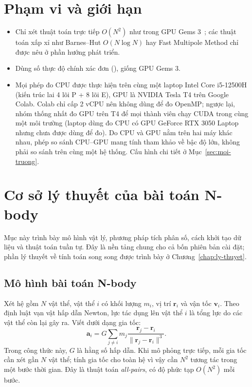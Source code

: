 \section{Phạm vi và giới hạn}

\begin{itemize}
\item Chỉ xét thuật toán trực tiếp $O(N^2)$ như trong GPU Gems 3~\cite{gpugems3}; các thuật toán xấp xỉ như Barnes--Hut $O(N\log N)$ hay Fast Multipole Method chỉ được nêu ở phần hướng phát triển.
\item Dùng số thực độ chính xác đơn (), giống GPU Gems 3.
\item Mọi phép đo CPU được thực hiện trên cùng một laptop Intel Core i5-12500H (kiến trúc lai 4 lõi P + 8 lõi E), GPU là NVIDIA Tesla T4 trên Google Colab. Colab chỉ cấp 2 vCPU nên không dùng để đo OpenMP; ngược lại, nhóm thống nhất đo GPU trên T4 để mọi thành viên chạy CUDA trong cùng một môi trường (laptop dùng đo CPU có GPU GeForce RTX 3050 Laptop nhưng chưa được dùng để đo). Do CPU và GPU nằm trên hai máy khác nhau, phép so sánh CPU--GPU mang tính tham khảo về bậc độ lớn, không phải so sánh trên cùng một hệ thống. Cấu hình chi tiết ở Mục~\ref{sec:moi-truong}.
\end{itemize}

\section{Cơ sở lý thuyết của bài toán N-body}
\label{sec:co-so-bai-toan}

Mục này trình bày mô hình vật lý, phương pháp tích phân số, cách khởi tạo dữ liệu và thuật toán tuần tự. Đây là nền tảng chung cho cả bốn phiên bản cài đặt; phần lý thuyết về tính toán song song được trình bày ở Chương~\ref{chap:ly-thuyet}.

\subsection{Mô hình bài toán N-body}

Xét hệ gồm $N$ vật thể, vật thể $i$ có khối lượng $m_i$, vị trí $\mathbf{r}_i$ và vận tốc $\mathbf{v}_i$. Theo định luật vạn vật hấp dẫn Newton, lực tác dụng lên vật thể $i$ là tổng lực do các vật thể còn lại gây ra. Viết dưới dạng gia tốc:
\begin{equation}
\mathbf{a}_i = G\sum_{j\ne i}m_j \frac{\mathbf{r}_j-\mathbf{r}_i}{\lVert\mathbf{r}_j-\mathbf{r}_i\rVert^3}.
\label{eq:newton}
\end{equation}
Trong công thức này, $G$ là hằng số hấp dẫn. Khi mô phỏng trực tiếp, mỗi gia tốc cần xét gần $N$ vật thể; tính gia tốc cho toàn hệ vì vậy cần $N^2$ tương tác trong một bước thời gian. Đây là thuật toán \emph{all-pairs}, có độ phức tạp $O(N^2)$ mỗi bước.

